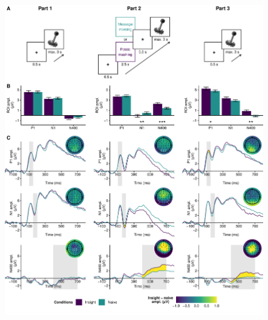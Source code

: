 \documentclass[
  english,
  man,floatsintext]{apa7}
\begin{document}
\begin{figure}

{\centering \includegraphics{manuscript_files/figure-latex/exp1-output-1} 

}

\caption{ }\label{fig:exp1-output}
\end{figure}
\end{document}
